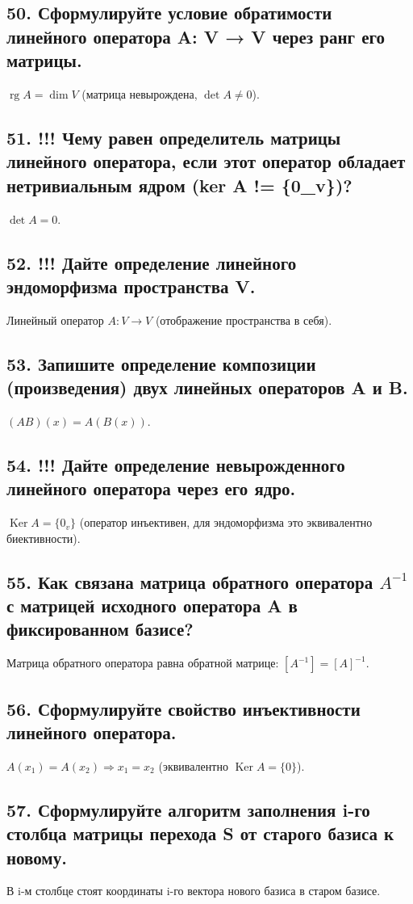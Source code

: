 \documentclass[a4paper,12pt]{article}
\newcommand{\rg}{\operatorname{rg}}
\newcommand{\ker}{\operatorname{Ker}}
\begin{document}
\subsection*{50. Сформулируйте условие обратимости линейного оператора A: V → V через ранг его матрицы.}
\(\rg A = \dim V\) (матрица невырождена, \(\det A \ne 0\)).

\subsection*{51. !!! Чему равен определитель матрицы линейного оператора, если этот оператор обладает нетривиальным ядром (ker A != \{0_v\})?}
\(\det A = 0\).

\subsection*{52. !!! Дайте определение линейного эндоморфизма пространства V.}
Линейный оператор \(A: V \to V\) (отображение пространства в себя).

\subsection*{53. Запишите определение композиции (произведения) двух линейных операторов A и B.}
\((AB)(x) = A(B(x))\).

\subsection*{54. !!! Дайте определение невырожденного линейного оператора через его ядро.}
\(\ker A = \{0_v\}\) (оператор инъективен, для эндоморфизма это эквивалентно биективности).

\subsection*{55. Как связана матрица обратного оператора $A^{-1}$ с матрицей исходного оператора A в фиксированном базисе?}
Матрица обратного оператора равна обратной матрице: \([A^{-1}] = [A]^{-1}\).

\subsection*{56. Сформулируйте свойство инъективности линейного оператора.}
\(A(x_1) = A(x_2) \Rightarrow x_1 = x_2\) (эквивалентно \(\ker A = \{0\}\)).

\subsection*{57. Сформулируйте алгоритм заполнения i-го столбца матрицы перехода S от старого базиса к новому.}
В i-м столбце стоят координаты i-го вектора нового базиса в старом базисе.
\end{document}
